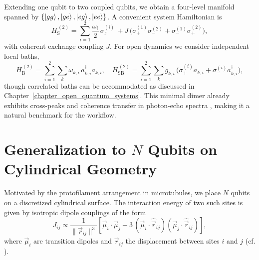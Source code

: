 Extending one qubit to two coupled qubits, we obtain a four-level manifold spanned by $\{\ket{gg},\ket{ge},\ket{eg},\ket{ee}\}$. A convenient system Hamiltonian is
\begin{equation}
	H_{\mathrm{S}}^{\,(2)} = \sum_{i=1}^{2} \frac{\omega_i}{2}\, \sigma_z^{(i)}
	\,+ J\,\bigl( \sigma_{+}^{(1)}\sigma_{-}^{(2)} + \sigma_{-}^{(1)}\sigma_{+}^{(2)} \bigr),
	\label{eq:two_qubit_system}
\end{equation}
with coherent exchange coupling $J$. For open dynamics we consider independent local baths,
\begin{equation}
	H_{\mathrm{B}}^{\,(2)} = \sum_{i=1}^{2} \sum_{k} \omega_{k,i}\, a_{k,i}^{\dagger} a_{k,i},
	\quad
	H_{\mathrm{SB}}^{\,(2)} = \sum_{i=1}^{2} \sum_{k} g_{k,i}\,\bigl( \sigma_{+}^{(i)} a_{k,i} + \sigma_{-}^{(i)} a_{k,i}^{\dagger} \bigr),
	\label{eq:two_qubit_bath}
\end{equation}
though correlated baths can be accommodated as discussed in Chapter~\ref{chapter_open_quantum_systems}. This minimal dimer already exhibits cross-peaks and coherence transfer in photon-echo spectra \cite{pisliakovetal2006twodimensionalopticalthreepulse}, making it a natural benchmark for the workflow.


\section{Generalization to \texorpdfstring{$N$}{N} Qubits on Cylindrical Geometry}

Motivated by the protofilament arrangement in microtubules, we place $N$ qubits on a discretized cylindrical surface. The interaction energy of two such sites is given by isotropic dipole couplings of the form \cite{griffiths2013introductionelectrodynamics}
\begin{equation}
	J_{ij} \propto \frac{1}{ \lVert \vec{r}_{ij} \rVert^{3} }
	\left[
		\vec{\mu}_i \cdot \vec{\mu}_j - 3\,(\vec{\mu}_i \cdot \hat{\vec{r}}_{ij})(\vec{\mu}_j \cdot \hat{\vec{r}}_{ij})
		\right],
	\label{eq:dipole_dipole}
\end{equation}
where $\vec{\mu}_i$ are transition dipoles and $\vec{r}_{ij}$ the displacement between sites $i$ and $j$ (cf. \cite{lehmberg1970radiationatomsystem,masters2014pathsforstersresonance}).


